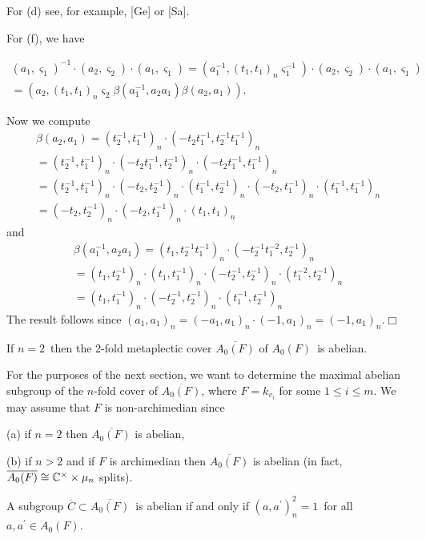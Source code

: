 For (d) see, for example, [Ge] or [Sa].

For (f), we have

\[
\begin{array}{c}
(a_1,\varsigma _1)^{-1}\cdot (a_2,\varsigma _2)\cdot (a_1,\varsigma
_1)=(a_1^{-1},(t_1,t_1)_n\varsigma _1^{-1})\cdot (a_2,\varsigma _2)\cdot
(a_1,\varsigma _1) \\ 
=(a_2,(t_1,t_1)_n\varsigma _2\beta (a_1^{-1},a_2a_1)\beta (a_2,a_1)).
\end{array}
\]

Now we compute 
\[
\begin{array}{c}
\beta (a_2,a_1)=(t_2^{-1},t_1^{-1})_n\cdot (-t_2t_1^{-1},t_2^{-1}t_1^{-1})_n
\\ 
=(t_2^{-1},t_1^{-1})_n\cdot (-t_2t_1^{-1},t_2^{-1})_n\cdot
(-t_2t_1^{-1},t_1^{-1})_n \\ 
=(t_2^{-1},t_1^{-1})_n\cdot (-t_2,t_2^{-1})_n\cdot
(t_1^{-1},t_2^{-1})_n\cdot (-t_2,t_1^{-1})_n\cdot (t_1^{-1},t_1^{-1})_n \\ 
=(-t_2,t_2^{-1})_n\cdot (-t_2,t_1^{-1})_n\cdot (t_1,t_1)_n
\end{array}
\]
and 
\[
\begin{array}{c}
\beta (a_1^{-1},a_2a_1)=(t_1,t_2^{-1}t_1^{-1})_n\cdot
(-t_2^{-1}t_1^{-2},t_2^{-1})_n \\ 
=(t_1,t_2^{-1})_n\cdot (t_1,t_1^{-1})_n\cdot (-t_2^{-1},t_2^{-1})_n\cdot
(t_1^{-2},t_2^{-1})_n \\ 
=(t_1,t_1^{-1})_n\cdot (-t_2^{-1},t_2^{-1})_n\cdot (t_1^{-1},t_2^{-1})_n
\end{array}
\]
The result follows since $(a_1,a_1)_n=(-a_1,a_1)_n\cdot
(-1,a_1)_n=(-1,a_1)_n $.$\Box $

\begin{corollary}
If $n=2$\ then the 2-fold metaplectic cover $\overline{A_0(F)}$ of $A_0(F)$\
is abelian.
\end{corollary}

For the purposes of the next section, we want to determine the maximal
abelian subgroup of the $n$-fold cover of $\overline{A_0(F)}$, where $%
F=k_{v_i}$ for some $1\leq i\leq m$. We may assume that $F$ is
non-archimedian since

(a) if $n=2$ then $\overline{A_0(F)}$ is abelian,

(b) if $n>2$ and if $F$ is archimedian then $\overline{A_0(F)}$ is abelian
(in fact, $\overline{A_0(F)}\cong {\Bbb C}^{\times }\times \mu _n$ splits).

\begin{lemma}
A subgroup $\overline{C}\subset \overline{A_0(F)}$\ is abelian if and only
if $(a,a^{\prime })_n^2=1$\ for all $a,a^{\prime }\in A_0(F)$.
\end{lemma}

